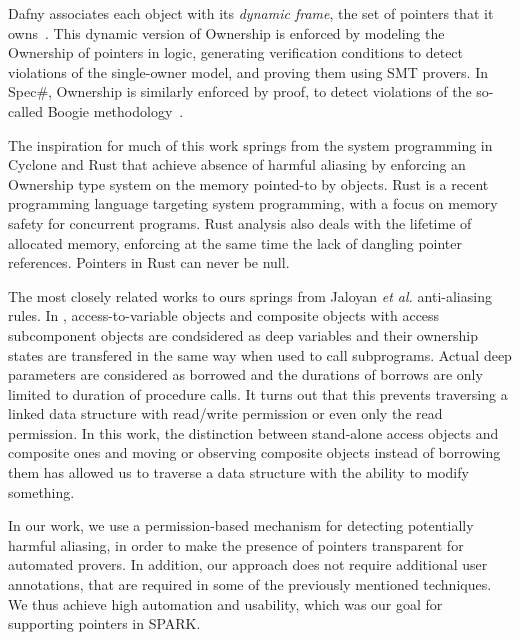 \documentclass{llncs}
\begin{document}
Dafny associates each object with its \emph{dynamic frame}, the set of pointers that it owns~\cite{Leino10}. This dynamic version of Ownership is
enforced by modeling the Ownership of pointers in logic, generating verification conditions to detect violations of the single-owner model, and proving
them using SMT provers. In Spec\#, Ownership is similarly enforced by proof, to detect violations of the so-called Boogie methodology~\cite{Boogie}.

The inspiration for much of this work springs from the system programming in Cyclone \cite{Grossman2002} and Rust \cite{Balasubramanian17} that achieve absence of
harmful aliasing by enforcing an Ownership type system on the memory pointed-to by objects. Rust is a recent programming language targeting system
programming, with a focus on memory safety for concurrent programs.
Rust analysis also deals with the lifetime of allocated memory, enforcing
at the same time the lack of dangling pointer references. Pointers in Rust can never be null.

The most closely related works to ours springs from Jaloyan \textit{et al.} \cite{Jaloyan18} anti-aliasing rules. In \cite{Jaloyan18}, access-to-variable objects
and composite objects with access subcomponent objects are condsidered as deep variables and their ownership states are transfered in the same way when used to call subprograms.
Actual deep parameters are considered as borrowed and the durations of borrows are only limited to duration of procedure calls.   
It turns out that this prevents traversing a linked data structure with read/write permission or even only the read permission. In this work, the distinction between stand-alone access
objects and composite ones and moving or observing composite objects instead of borrowing them has allowed us to traverse a data structure with the ability to modify something. 

In our work, we use a permission-based mechanism for detecting potentially harmful aliasing, in order to make the presence of pointers transparent for automated provers.
In addition, our approach does not require additional user annotations, that are required in some of the previously mentioned techniques. We thus achieve high automation
and usability, which was our goal for supporting pointers in SPARK.
\end{document}
